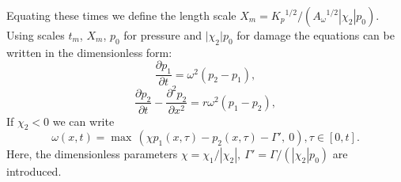 \documentclass[article,authoryear,jpm]{beg_39}             %
\begin{document}
Equating these times we define the length scale ${{X}_{m}}={{K}_{p}}^{1/2}/({{A}_{\omega }}^{1/2}{|{\chi }_{2}|}{{p}_{0}})$. Using scales ${t}_{m}$, ${X}_{m}$, $p_0$ for pressure and ${|\chi }_{2}|{{p}_{0}}$ for damage the equations can be written in the dimensionless form:
\begin{equation}
\frac{\partial {{p}_{1}}}{\partial t}={{\omega }^{2}}({{p}_{2}}-{{p}_{1}}),
\end{equation}
\begin{equation}
\frac{\partial {{p}_{2}}}{\partial t}-\frac{{{\partial }^{2}}{{p}_{2}}}{\partial {{x}^{2}}}=r{{\omega }^{2}}({{p}_{1}}-{{p}_{2}}),
\end{equation}
If ${{\chi}_{2}}< 0$ we can write
\begin{equation}
\omega (x,t)={\mathop{\max }}\,\left(  \chi {{p}_{1}}(x,\tau )-{{p}_{2}}(x,\tau )-{\Gamma }',\ 0 \right), \tau \in [0,t].
\end{equation}
Here, the dimensionless parameters $\chi ={{\chi }_{1}}/{|{\chi }_{2}|},\ {\Gamma }'=\Gamma /({|{\chi }_{2}|}{{p}_{0}})$ are introduced.
\end{document}
